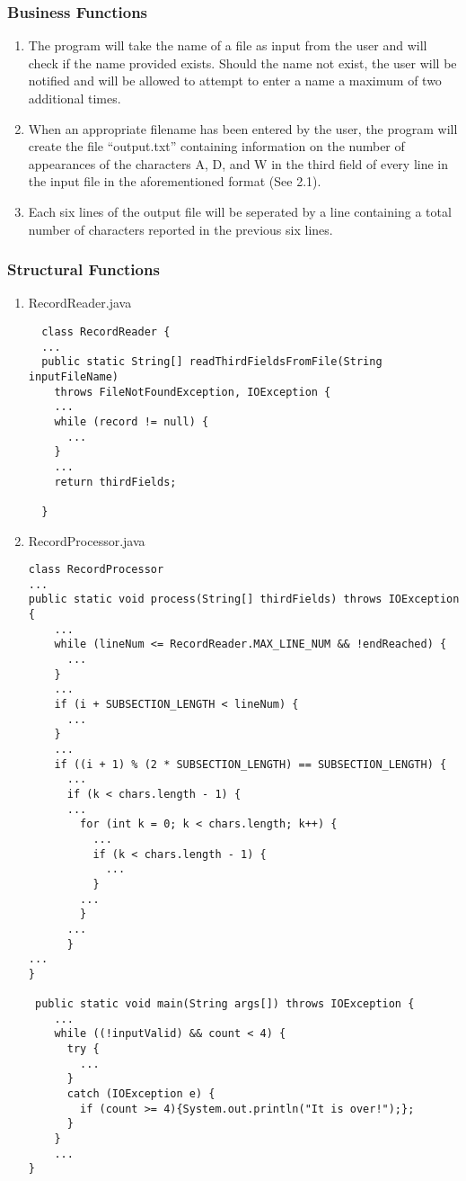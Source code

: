 \documentclass[]{article}
\begin{document}
\subsubsection{Business Functions}
\label{sub:user_characteristics}
\begin{enumerate}
  \item The program will take the name of a file as input from the user and will
  check if the name provided exists.  Should the name not exist, the user will
  be notified and will be allowed to attempt to enter a name a maximum of two
  additional times.
  \item When an appropriate filename has been entered by the user, the program
  will create the file ``output.txt'' containing information on the number of
  appearances of the characters A, D, and W in the third field of every line in
  the input file in the aforementioned format (See 2.1).
  \item Each six lines of the output file will be seperated by a line
  containing a total number of characters reported in the previous six lines.
\end{enumerate}

\subsubsection{Structural Functions}
\label{sub:user_characteristics}

\begin{enumerate}
  \item RecordReader.java
  \begin{lstlisting}
  class RecordReader {
  ...
  public static String[] readThirdFieldsFromFile(String inputFileName)
    throws FileNotFoundException, IOException {
    ...
    while (record != null) {
      ...
    }
    ...
    return thirdFields;

  }
  \end{lstlisting} 

  \item RecordProcessor.java
\begin{lstlisting}
class RecordProcessor
...
public static void process(String[] thirdFields) throws IOException {
	...
	while (lineNum <= RecordReader.MAX_LINE_NUM && !endReached) {
      ...
    }
    ...
	if (i + SUBSECTION_LENGTH < lineNum) {
	  ...
	}
	...
	if ((i + 1) % (2 * SUBSECTION_LENGTH) == SUBSECTION_LENGTH) {
	  ...
	  if (k < chars.length - 1) {
	  ...
        for (int k = 0; k < chars.length; k++) {
          ...
          if (k < chars.length - 1) {
            ...
          }
        ...
	    }
	  ...
	  }
...
}

 public static void main(String args[]) throws IOException {
 	...
	while ((!inputValid) && count < 4) {
	  try {
		...
	  }
	  catch (IOException e) {
	    if (count >= 4){System.out.println("It is over!");};
	  }
	}
	...
}
\end{lstlisting}
\end{enumerate}
\end{document}
